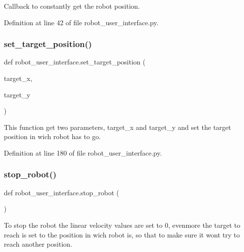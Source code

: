 Callback to constantly get the robot position. 



Definition at line 42 of file robot\+\_\+user\+\_\+interface.\+py.

\mbox{\label{namespacerobot__user__interface_ac0177573471df46aa7986edba5620184}} 
\subsubsection{\texorpdfstring{set\+\_\+target\+\_\+position()}{set\_target\_position()}}
{\footnotesize\ttfamily def robot\+\_\+user\+\_\+interface.\+set\+\_\+target\+\_\+position (\begin{DoxyParamCaption}\item[{}]{target\+\_\+x,  }\item[{}]{target\+\_\+y }\end{DoxyParamCaption})}



This function get two parameters, target\+\_\+x and target\+\_\+y and set the target position in wich robot has to go. 



Definition at line 180 of file robot\+\_\+user\+\_\+interface.\+py.

\mbox{\label{namespacerobot__user__interface_a70a457867820599c4b2a30f4027dd513}} 
\subsubsection{\texorpdfstring{stop\+\_\+robot()}{stop\_robot()}}
{\footnotesize\ttfamily def robot\+\_\+user\+\_\+interface.\+stop\+\_\+robot (\begin{DoxyParamCaption}{ }\end{DoxyParamCaption})}



To stop the robot the linear velocity values are set to 0, evenmore the target to reach is set to the position in wich robot is, so that to make sure it won\textquotesingle{}t try to reach another position. 




